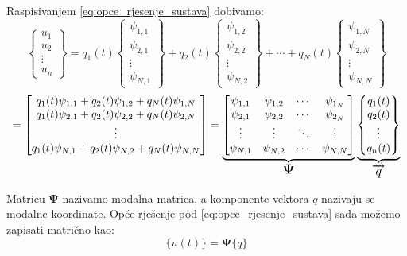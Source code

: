 \documentclass{rgn}
\newcommand\ppsi{\mathbf{\Psi}}
\begin{document}
Raspisivanjem \eqref{eq:opce_rjesenje_sustava} dobivamo:
\[
	\begin{Bmatrix}
		u_1\\
		u_2\\
		\vdots\\
		u_n
	\end{Bmatrix}
	=
	q_1(t)
	\begin{Bmatrix}
		\psi_{1,1}\\
		\psi_{2,1}\\
		\vdots\\
		\psi_{N,1}
	\end{Bmatrix}
	+
	q_2(t)
	\begin{Bmatrix}
		\psi_{1,2}\\
		\psi_{2,2}\\
		\vdots\\
		\psi_{N,2}
	\end{Bmatrix}
		+
		\cdots
		+
	q_N(t)
	\begin{Bmatrix}
		\psi_{1,N}\\
		\psi_{2,N}\\
		\vdots\\
		\psi_{N,N}
	\end{Bmatrix}
	\]
\[
	=
	\begin{bmatrix}
		q_1(t) \psi_{1,1} + q_2(t) \psi_{1,2} + q_N(t) \psi_{1,N} \\
		q_1(t) \psi_{2,1} + q_2(t) \psi_{2,2} + q_N(t) \psi_{2,N} \\
		\vdots \\
		q_1(t) \psi_{N,1} + q_2(t) \psi_{N,2} + q_N(t) \psi_{N,N}
	\end{bmatrix}
	=
	\underbrace{
	\begin{bmatrix}
		\psi_{1,1} & \psi_{1,2} & \cdots & \psi_{1_N} \\
		\psi_{2,1} & \psi_{2,2} & \cdots & \psi_{2_N} \\
		\vdots & \vdots & \ddots & \vdots \\
		\psi_{N,1} & \psi_{N,2} & \cdots & \psi_{N,N} 
	\end{bmatrix}
	}_{\text{\large{$\ppsi$}}}
	\underbrace{
	\begin{Bmatrix}
		q_1(t) \\
		q_2(t) \\
		\vdots \\
		q_n(t)
	\end{Bmatrix}
	}_{\text{\large{$\overrightarrow{q}$}}}
\]

Matricu $\ppsi$ nazivamo modalna matrica, a komponente vektora $q$ nazivaju se
modalne koordinate. Opće rješenje pod \eqref{eq:opce_rjesenje_sustava} sada možemo 
zapisati matrično kao:
\begin{equation}
    \{u(t)\} = \ppsi \{q\}
\end{equation}
\end{document}
